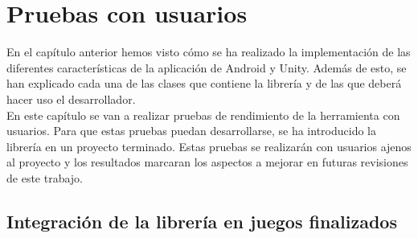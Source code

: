 %
%
%
%
%
%
%
%
%
%

\chapter{Pruebas con usuarios}
\label{cap5}
\label{cap:pruebas}

En el cap\'itulo anterior hemos visto c\'omo se ha realizado la implementaci\'on de las diferentes caracter\'isticas de la aplicaci\'on de Android y Unity. Adem\'as de esto, se han explicado cada una de las clases que contiene la librer\'ia y de las que deber\'a hacer uso el desarrollador.\\
En este cap\'itulo se van a realizar pruebas de rendimiento de la herramienta con usuarios. Para que estas pruebas puedan desarrollarse, se ha introducido la librer\'ia en un proyecto terminado. Estas pruebas se realizar\'an con usuarios ajenos al proyecto y los resultados marcaran los aspectos a mejorar en futuras revisiones de este trabajo. \\

\section{Integraci\'on de la librer\'ia en juegos finalizados}

